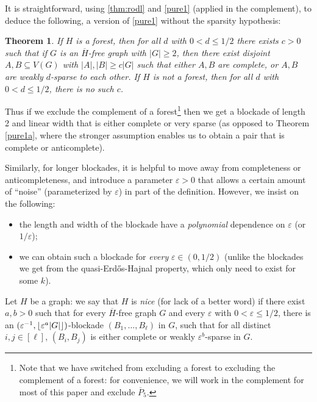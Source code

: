 \documentclass[11pt,reqno,a4paper]{amsart}
\newtheorem{theorem}{Theorem}[section]
\newcommand{\eps}{\varepsilon}
\DeclarePairedDelimiter\abs{\lvert}{\rvert}%
\DeclarePairedDelimiter\floor{\lfloor}{\rfloor}%
\begin{document}
	It is straightforward, using \cref{thm:rodl} and \cref{pure1} (applied in the complement), to deduce the following, a version of \cref{pure1} 
	without the sparsity hypothesis:
	\begin{theorem} \label{pure1mixed}
		If $H$ is a forest, then for all $d$ with $0<d\le 1/2$ there exists $c>0$ such that if $G$ is an $\overline{H}$-free graph  with $|G|\ge 2$, then there exist disjoint $A,B\subseteq V(G)$ with $|A|,|B|\ge c|G|$ such that either $A,B$ are complete, or $A,B$ are weakly $d$-sparse to each other. If $H$ is not a forest, then for all $d$ with $0<d\le 1/2$, there is no such $c$.
	\end{theorem}
	Thus if we exclude the complement of a forest\footnote{Note that we have switched from excluding a forest to excluding the complement of a forest: for convenience, we will work in the complement for most of this paper and exclude $\overline P_5$.} then we get a blockade of length 2 and linear width that is either complete or very sparse (as opposed to Theorem \ref{pure1a}, where the stronger assumption enables us to obtain a pair that is complete or anticomplete).  
	
	
	Similarly, for longer blockades,	 
	it is helpful to move away from completeness or anticompleteness, and introduce a parameter $\eps>0$ that allows a certain amount of ``noise'' (parameterized by $\eps$) in part of the definition.  However, we insist on the following:
	\begin{itemize}
		\item the length and width of the blockade have a {\em polynomial} dependence on $\eps$ (or $1/\eps$);
		\item we can obtain such a blockade for {\em every} $\eps\in(0,1/2)$ (unlike the blockades we get from the
		quasi-Erd\H os-Hajnal property, which only need to exist for some $k$).
	\end{itemize}
	
	Let $H$ be a graph: we say that $H$ is {\em nice} (for lack of a better word) if there exist $a,b>0$ such that for every $\overline{H}$-free graph $G$ and every $\eps$ with $0<\eps\le 1/2$, there is an $(\eps^{-1},\floor{\eps^{a}\abs G})$-blockade $(B_1,\ldots,B_{\ell})$ in $G$, such that for all distinct $i,j\in[\ell]$, $(B_i,B_j)$ is either complete or weakly $\eps^b$-sparse in $G$. 
	
\end{document}
